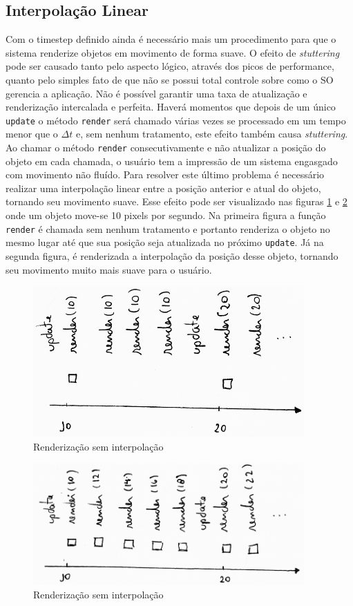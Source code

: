 \documentclass[12pt, 
openright, 
oneside, 
a4paper,    
brazil]{facom-ufu-abntex2}
\begin{document}
\subsection{Interpolação Linear} 
Com o timestep definido ainda é necessário mais um procedimento para que o sistema renderize objetos em movimento de forma suave. O efeito de \textit{stuttering} pode ser causado tanto pelo aspecto lógico, através dos picos de performance, quanto pelo simples fato de que não se possui total controle sobre como o SO gerencia a aplicação. Não é possível garantir uma taxa de atualização e renderização intercalada e perfeita. Haverá momentos que depois de um único \texttt{update} o método \texttt{render} será chamado várias vezes se processado em um tempo menor que o $\Delta t$ e, sem nenhum tratamento, este efeito também causa \textit{stuttering}. Ao chamar o método \texttt{render} consecutivamente e não atualizar a posição do objeto em cada chamada, o usuário tem a impressão de um sistema engasgado com movimento não fluído.
Para resolver este último problema é necessário realizar uma interpolação linear entre a posição anterior e atual do objeto, tornando seu movimento suave. Esse efeito pode ser visualizado nas figuras \ref{fig:renderSemInterpolacao} e \ref{fig:renderComInterpolacao} onde um objeto move-se 10 pixels por segundo. Na primeira figura a função \texttt{render} é chamada sem nenhum tratamento e portanto renderiza o objeto no mesmo lugar até que sua posição seja atualizada no próximo \texttt{update}. Já na segunda figura, é renderizada a interpolação da posição desse objeto, tornando seu movimento muito mais suave para o usuário.
\begin{figure}[H]
	\centering
	\includegraphics[width=28em]{imagens/ilu7_small.png}
	\caption{Renderização sem interpolação
	\label{fig:renderSemInterpolacao}}
\end{figure}
\begin{figure}[H]
	\centering
	\includegraphics[width=28em]{imagens/ilu5_small.png}
	\caption{Renderização sem interpolação
	\label{fig:renderComInterpolacao}}
\end{figure}
\end{document}
